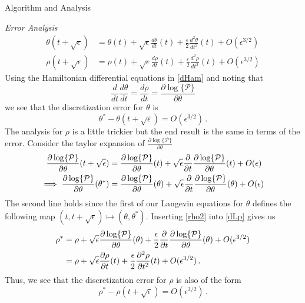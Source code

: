 \documentclass{article}
\begin{document}
\begin{section}{Algorithm and Analysis}
\begin{subsection}{\it Error Analysis}
\begin{align}
\theta(t+\sqrt{\epsilon}) & = \theta(t) + \sqrt{\epsilon} \frac{d \theta}{dt}(t) + \frac{\epsilon}{2}\frac{d^2\theta}{dt^2}(t) + O(\epsilon^{3/2}) \label{tay_t} \\
\rho(t+\sqrt{\epsilon}) & = \rho(t) + \sqrt{\epsilon} \frac{d \rho}{dt}(t) + \frac{\epsilon}{2}\frac{d^2\rho}{dt^2}(t) + O(\epsilon^{3/2}) \label{tay_p}
\end{align}
Using the Hamiltonian differential equations in \eqref{dHam} and noting that $$\frac{d}{dt}\frac{d \theta}{dt}  = \frac{d \rho}{dt} =  \frac{\partial \log\{\mathcal{P}\}}{\partial \theta}$$ we see that the discretization error for $\theta$ is  
\begin{equation}
\theta^* - \theta(t+\sqrt{\epsilon}) = O(\epsilon^{3/2})\,. \label{err_t}
\end{equation}
The analysis for $\rho$ is a little trickier but the end result is the same in terms of the error.  Consider the taylor expansion of $\frac{\partial \log\{\mathcal{P}\}}{\partial \theta}$
\begin{align}
\frac{\partial \log\{\mathcal{P}\}}{\partial \theta}(t+\sqrt{\epsilon}) & = \frac{\partial \log\{\mathcal{P}\}}{\partial \theta}(t) + \sqrt{\epsilon}\frac{\partial}{\partial t}\frac{\partial \log\{\mathcal{P}\}}{\partial \theta}(t) + O(\epsilon) \notag \\
\implies \frac{\partial \log\{\mathcal{P}\}}{\partial \theta}(\theta^*) & = \frac{\partial \log\{\mathcal{P}\}}{\partial \theta}(\theta) + \sqrt{\epsilon}\frac{\partial}{\partial t}\frac{\partial \log\{\mathcal{P}\}}{\partial \theta}(\theta) + O(\epsilon) \label{rho2}
\end{align}
The second line holds since the first of our Langevin equations for $\theta$ defines the following map $(t,t+\sqrt{\epsilon}) \mapsto (\theta,\theta^*)$.  Inserting \eqref{rho2} into \eqref{dLp} gives us
\begin{align}
\rho^*  & = \rho+ \sqrt{\epsilon}\frac{\partial  \log\{\mathcal{P}\}}{\partial \theta}(\theta) + \frac{\epsilon}{2} \frac{\partial}{\partial t} \frac{\partial \log\{\mathcal{P}\}}{\partial \theta}(\theta) + O(\epsilon^{3/2}) \notag \\
& = \rho+ \sqrt{\epsilon}\frac{\partial \rho}{\partial t}(t) + \frac{\epsilon}{2} \frac{\partial^2\rho}{\partial t^2}(t) + O(\epsilon^{3/2}) \,. \label{dLp2}
\end{align}
Thus, we see that the discretization error for $\rho$ is also of the form
\begin{equation}
\rho^* - \rho(t+\sqrt{\epsilon}) = O(\epsilon^{3/2})\,. \label{err_p}

\end{equation}
\end{subsection}
\end{section}
\end{document}
